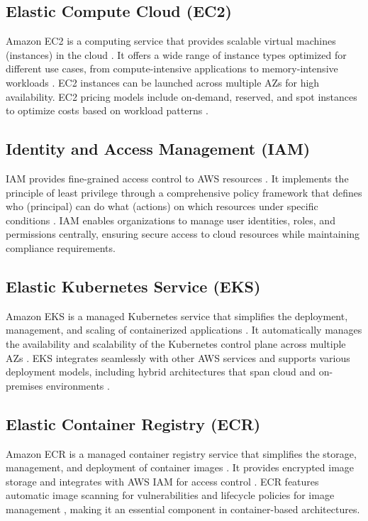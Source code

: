 \subsection{Elastic Compute Cloud (EC2)}
Amazon EC2 is a computing service that provides scalable virtual machines (instances) in the cloud \cite{ec2_definition}. It offers a wide range of instance types optimized for different use cases, from compute-intensive applications to memory-intensive workloads \cite{ec2_instance_types}. EC2 instances can be launched across multiple AZs for high availability. EC2 pricing models include on-demand, reserved, and spot instances to optimize costs based on workload patterns \cite{ec2_pricing}.

\subsection{Identity and Access Management (IAM)}
IAM provides fine-grained access control to AWS resources \cite{iam_definition}. It implements the principle of least privilege through a comprehensive policy framework that defines who (principal) can do what (actions) on which resources under specific conditions \cite{iam_security}. IAM enables organizations to manage user identities, roles, and permissions centrally, ensuring secure access to cloud resources while maintaining compliance requirements.

\subsection{Elastic Kubernetes Service (EKS)}
Amazon EKS is a managed Kubernetes service that simplifies the deployment, management, and scaling of containerized applications \cite{eks_definition}. It automatically manages the availability and scalability of the Kubernetes control plane across multiple AZs \cite{eks_definition}. EKS integrates seamlessly with other AWS services and supports various deployment models, including hybrid architectures that span cloud and on-premises environments \cite{eks_deployment}.

\subsection{Elastic Container Registry (ECR)}
Amazon ECR is a managed container registry service that simplifies the storage, management, and deployment of container images \cite{ecr_definition}. It provides encrypted image storage and integrates with AWS IAM for access control \cite{ecr_iam}. ECR features automatic image scanning for vulnerabilities \cite{ecr_image_scanning} and lifecycle policies for image management \cite{ecr_lifecycle}, making it an essential component in container-based architectures.

